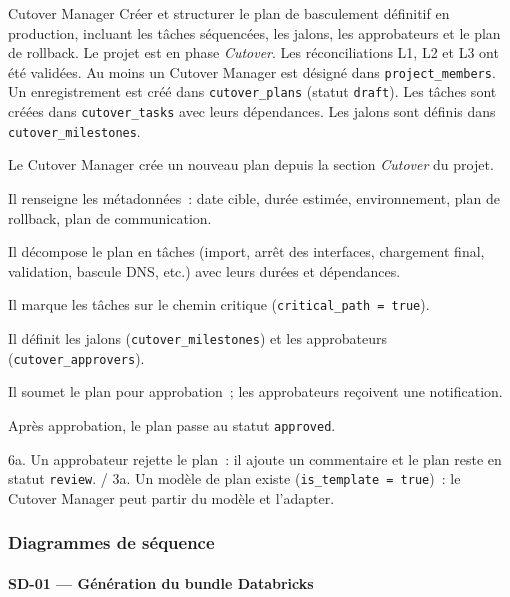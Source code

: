%
{Cutover Manager}%
{Créer et structurer le plan de basculement définitif en production, incluant les tâches séquencées, les jalons, les approbateurs et le plan de rollback.}%
{Le projet est en phase \textit{Cutover}. Les réconciliations L1, L2 et L3 ont été validées. Au moins un Cutover Manager est désigné dans \texttt{project\_members}.}%
{Un enregistrement est créé dans \texttt{cutover\_plans} (statut \texttt{draft}). Les tâches sont créées dans \texttt{cutover\_tasks} avec leurs dépendances. Les jalons sont définis dans \texttt{cutover\_milestones}.}%
{%
\item Le Cutover Manager crée un nouveau plan depuis la section \textit{Cutover} du projet.
\item Il renseigne les métadonnées~: date cible, durée estimée, environnement, plan de rollback, plan de communication.
\item Il décompose le plan en tâches (import, arrêt des interfaces, chargement final, validation, bascule DNS, etc.) avec leurs durées et dépendances.
\item Il marque les tâches sur le chemin critique (\texttt{critical\_path = true}).
\item Il définit les jalons (\texttt{cutover\_milestones}) et les approbateurs (\texttt{cutover\_approvers}).
\item Il soumet le plan pour approbation~; les approbateurs reçoivent une notification.
\item Après approbation, le plan passe au statut \texttt{approved}.
}%
{6a. Un approbateur rejette le plan~: il ajoute un commentaire et le plan reste en statut \texttt{review}. / 3a. Un modèle de plan existe (\texttt{is\_template = true})~: le Cutover Manager peut partir du modèle et l'adapter.}

\subsubsection{Diagrammes de séquence}
\label{subsubsec:sequence-diagrams}

\paragraph{SD-01 --- Génération du bundle Databricks}

